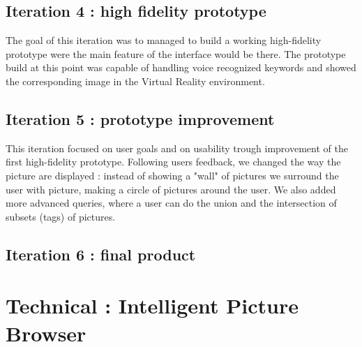 \documentclass[11pt,a4paper]{article}
\begin{document}
\subsection{Iteration 4 : high fidelity prototype}

The goal of this iteration was to managed to build a working high-fidelity prototype were the main feature of the interface would be there.
The prototype build at this point was capable of handling voice recognized keywords and showed the corresponding image in the Virtual Reality environment.

\subsection{Iteration 5 : prototype improvement}

This iteration focused on user goals and on usability trough improvement of the first high-fidelity prototype. Following users feedback, we changed the way the picture are displayed : instead of showing a "wall" of pictures we surround the user with picture, making a circle of pictures around the user.
We also added more advanced queries, where a user can do the union and the intersection of subsets (tags) of pictures.

\subsection{Iteration 6 : final product}








\section{Technical : Intelligent Picture Browser}



\end{document}

